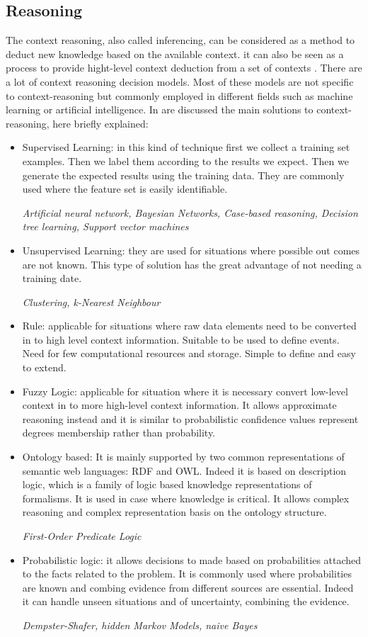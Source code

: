 \documentclass{thesisreport}
\begin{document}
 
 \subsection{Reasoning}
 The context reasoning, also called inferencing, can be considered as a method to deduct new knowledge based on the available context.  
 it can also be seen as a process to provide hight-level context deduction from a set of contexts \cite{perera2014context}.
 There are a lot of context reasoning decision models. Most of these models are not specific to context-reasoning but commonly employed in different fields such as machine learning or artificial intelligence.
 In \cite{perera2014context} are discussed the main solutions to context-reasoning, here briefly explained: 
 \begin{itemize}
     \item Supervised Learning: in this kind of technique first we collect a training set examples. Then we label them according to the results we expect. Then we generate the expected results using the training data.
     They are commonly used where the feature set is easily identifiable.
     
     \textit{Artificial neural network, Bayesian Networks, Case-based reasoning, Decision tree learning, Support vector machines}
     \item Unsupervised Learning: they are used for situations where possible out comes are not known. This type of solution has the great advantage of not needing a training date.
     
     \textit{Clustering, k-Nearest Neighbour}
     \item Rule: applicable for situations where raw data elements need to be converted in to high level context information. Suitable to be used to define events. Need for few computational resources and storage. Simple to define and easy to extend.
     \item Fuzzy Logic: applicable for situation where it is necessary convert low-level context in to more high-level context information. It allows approximate reasoning instead and it is similar to probabilistic confidence values represent degrees membership rather than probability.
     \item Ontology based: It is mainly supported by two common representations of semantic web languages: RDF and OWL. Indeed it is based on description logic, which is a family of logic based knowledge representations of formalisms. It is used in case where knowledge is critical. It allows complex reasoning and complex representation basis on the ontology structure.
    
     \textit{First-Order Predicate Logic}
     
     \item Probabilistic logic: it allows decisions to made based on probabilities attached to the facts related to the problem. It is commonly used where probabilities are known and combing evidence from different sources are essential. Indeed it can handle unseen situations and of uncertainty, combining the evidence.  
     
     \textit{Dempster-Shafer, hidden Markov Models, naive Bayes}
 \end{itemize}
\end{document}
